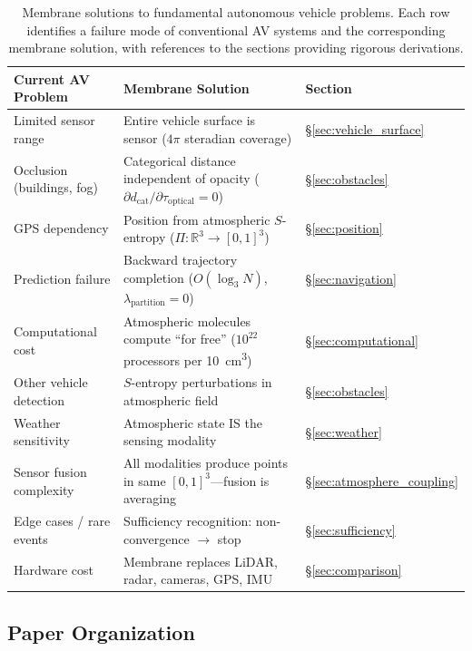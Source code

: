 \documentclass[12pt]{article}
\theoremstyle{definition}
\theoremstyle{remark}
\newcommand{\dcat}{d_{\mathrm{cat}}}
\begin{document}
\begin{table}[H]
\centering
\caption{Membrane solutions to fundamental autonomous vehicle problems. Each row identifies a failure mode of conventional AV systems and the corresponding membrane solution, with references to the sections providing rigorous derivations.}
\label{tab:av_problems}
\small
\begin{tabularx}{\textwidth}{@{}p{3.5cm}p{4.5cm}X@{}}
\toprule
\textbf{Current AV Problem} & \textbf{Membrane Solution} & \textbf{Section} \\
\midrule
Limited sensor range & Entire vehicle surface is sensor ($4\pi$ steradian coverage) & \S\ref{sec:vehicle_surface} \\
Occlusion (buildings, fog) & Categorical distance independent of opacity ($\partial \dcat/\partial\tau_{\mathrm{optical}} = 0$) & \S\ref{sec:obstacles} \\
GPS dependency & Position from atmospheric $S$-entropy ($\Pi: \mathbb{R}^3 \to [0,1]^3$) & \S\ref{sec:position} \\
Prediction failure & Backward trajectory completion ($O(\log_3 N)$, $\lambda_{\mathrm{partition}} = 0$) & \S\ref{sec:navigation} \\
Computational cost & Atmospheric molecules compute ``for free'' ($10^{22}$ processors per \SI{10}{cm^3}) & \S\ref{sec:computational} \\
Other vehicle detection & $S$-entropy perturbations in atmospheric field & \S\ref{sec:obstacles} \\
Weather sensitivity & Atmospheric state IS the sensing modality & \S\ref{sec:weather} \\
Sensor fusion complexity & All modalities produce points in same $[0,1]^3$---fusion is averaging & \S\ref{sec:atmosphere_coupling} \\
Edge cases / rare events & Sufficiency recognition: non-convergence $\to$ stop & \S\ref{sec:sufficiency} \\
Hardware cost & Membrane replaces LiDAR, radar, cameras, GPS, IMU & \S\ref{sec:comparison} \\
\bottomrule
\end{tabularx}
\end{table}

\subsection{Paper Organization}
\end{document}

